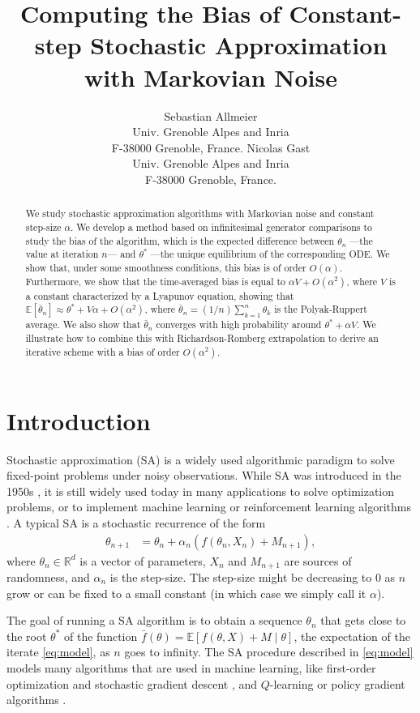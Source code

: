 \documentclass{article}
\title{Computing the Bias of Constant-step Stochastic Approximation with Markovian Noise}
\author{Sebastian Allmeier\\
Univ. Grenoble Alpes and Inria\\
F-38000 Grenoble, France.
 \And Nicolas Gast\\
 Univ. Grenoble Alpes and Inria\\
 F-38000 Grenoble, France.}
\newcommand{\R}{\mathbb{R}}
\newcommand\E{\mathbb{E}}
\newcommand\esp[1]{\E\left[#1\right]}
\begin{document}
\maketitle

\begin{abstract}
    We study stochastic approximation algorithms with Markovian noise and constant step-size $\alpha$. We develop a method based on infinitesimal generator comparisons to study the bias of the algorithm, which is the expected difference between $\theta_n$ ---the value at iteration $n$--- and $\theta^*$ ---the unique equilibrium of the corresponding ODE. We show that, under some smoothness conditions, this bias is of order $O(\alpha)$. Furthermore, we show that the time-averaged bias is equal to $\alpha V + O(\alpha^2)$, where $V$ is a constant characterized by a Lyapunov equation, showing that $\esp{\bar{\theta}_n} \approx \theta^*+V\alpha + O(\alpha^2)$, where $\bar{\theta}_n=(1/n)\sum_{k=1}^n\theta_k$ is the Polyak-Ruppert average.  We also show that $\bar{\theta}_n$ converges with high probability around $\theta^*+\alpha V$. We illustrate how to combine this with Richardson-Romberg extrapolation to derive an iterative scheme with a bias of order $O(\alpha^2)$. 
\end{abstract}

\section{Introduction}
\label{sec:intro}

Stochastic approximation (SA) is a widely used algorithmic paradigm to solve fixed-point problems under noisy observations. While SA was introduced in the 1950s \cite{robbins1951stochastic,blum1954approximation}, it is still widely used today in many applications to solve optimization problems, or to implement machine learning or reinforcement learning algorithms \cite{kushner2003stochastic,bertsekas2019reinforcement}. A typical SA is a stochastic recurrence of the form
\begin{align}
    \label{eq:model}
    \theta_{n+1} &= \theta_n + \alpha_n ( f(\theta_n, X_n) + M_{n+1}),
\end{align}
where $\theta_n\in\R^d$ is a vector of parameters, $X_n$ and $M_{n+1}$ are sources of randomness, and $\alpha_n$ is the step-size. The step-size might be decreasing to $0$ as $n$ grow or can be fixed to a small constant (in which case we simply call it $\alpha$).

The goal of running a SA algorithm is to obtain a sequence $\theta_n$ that gets close to the root $\theta^*$ of the function $\bar{f}(\theta) = \esp{f(\theta, X)+M \mid \theta}$, the expectation of the iterate \eqref{eq:model}, as $n$ goes to infinity. The SA procedure described in \eqref{eq:model} models many algorithms that are used in machine learning, like first-order optimization and stochastic gradient descent \cite{lan2020first,dieuleveut2020bridging}, and $Q$-learning or policy gradient algorithms \cite{bertsekas2019reinforcement,sutton2018reinforcement}.
\end{document}

